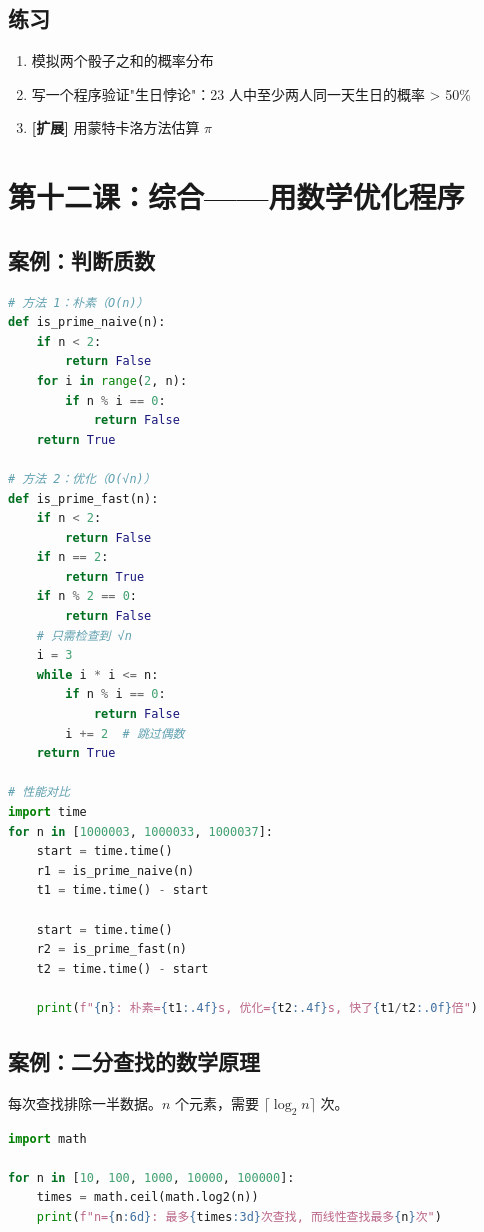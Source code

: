 \documentclass[a4paper,12pt]{ctexart}
\begin{document}
\subsection*{练习}

\begin{enumerate}
  \item 模拟两个骰子之和的概率分布
  \item 写一个程序验证"生日悖论"：23 人中至少两人同一天生日的概率 > 50\%
  \item \textbf{[扩展]} 用蒙特卡洛方法估算 $\pi$
\end{enumerate}

\section*{第十二课：综合——用数学优化程序}

\subsection*{案例：判断质数}

\begin{lstlisting}[language=Python]
# 方法 1：朴素（O(n)）
def is_prime_naive(n):
    if n < 2:
        return False
    for i in range(2, n):
        if n % i == 0:
            return False
    return True

# 方法 2：优化（O(√n)）
def is_prime_fast(n):
    if n < 2:
        return False
    if n == 2:
        return True
    if n % 2 == 0:
        return False
    # 只需检查到 √n
    i = 3
    while i * i <= n:
        if n % i == 0:
            return False
        i += 2  # 跳过偶数
    return True

# 性能对比
import time
for n in [1000003, 1000033, 1000037]:
    start = time.time()
    r1 = is_prime_naive(n)
    t1 = time.time() - start
    
    start = time.time()
    r2 = is_prime_fast(n)
    t2 = time.time() - start
    
    print(f"{n}: 朴素={t1:.4f}s, 优化={t2:.4f}s, 快了{t1/t2:.0f}倍")
\end{lstlisting}

\subsection*{案例：二分查找的数学原理}

每次查找排除一半数据。$n$ 个元素，需要 $\lceil \log_2 n \rceil$ 次。

\begin{lstlisting}[language=Python]
import math

for n in [10, 100, 1000, 10000, 100000]:
    times = math.ceil(math.log2(n))
    print(f"n={n:6d}: 最多{times:3d}次查找, 而线性查找最多{n}次")
\end{lstlisting}
\end{document}
